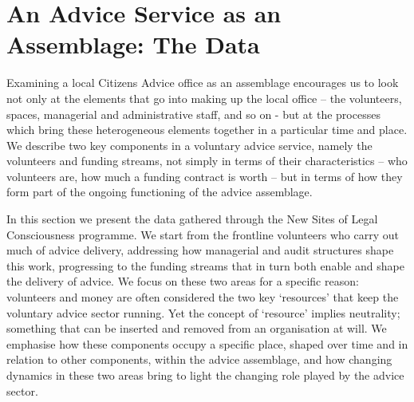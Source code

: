 \chapter{An Advice Service as an Assemblage: The Data}
Examining a local Citizens Advice office as an assemblage encourages us to look not only at the elements that go into making up the local office – the volunteers, spaces, managerial and administrative staff, and so on - but at the processes which bring these heterogeneous elements together in a particular time and place. We describe two key components in a voluntary advice service, namely the volunteers and funding streams, not simply in terms of their characteristics – who volunteers are, how much a funding contract is worth – but in terms of how they form part of the ongoing functioning of the advice assemblage.
\par
In this section we present the data gathered through the New Sites of Legal Consciousness programme. We start from the frontline volunteers who carry out much of advice delivery, addressing how managerial and audit structures shape this work, progressing to the funding streams that in turn both enable and shape the delivery of advice. We focus on these two areas for a specific reason: volunteers and money are often considered the two key ‘resources’ that keep the voluntary advice sector running. Yet the concept of ‘resource’ implies neutrality; something that can be inserted and removed from an organisation at will. We emphasise how these components occupy a specific place, shaped over time and in relation to other components, within the advice assemblage, and how changing dynamics in these two areas bring to light the changing role played by the advice sector.

